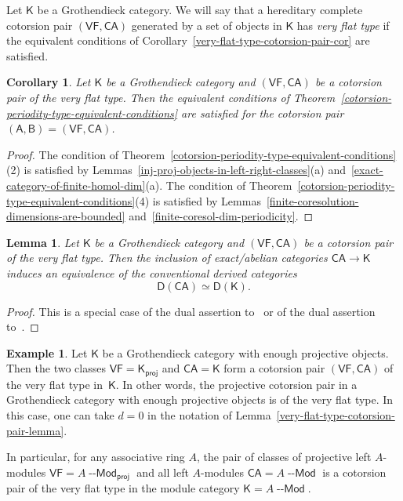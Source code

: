 \documentclass[12pt,a4paper]{amsart}
\newcommand{\+}{\nobreakdash-}
\renewcommand{\:}{\colon}
\newcommand{\rarrow}{\longrightarrow}
\newcommand{\Modl}{{\operatorname{\mathsf{--Mod}}}}
\newcommand{\sA}{\mathsf A}
\newcommand{\sB}{\mathsf B}
\newcommand{\sD}{\mathsf D}
\newcommand{\sK}{\mathsf K}
\newcommand{\VF}{\mathsf{VF}}
\newcommand{\CA}{\mathsf{CA}}
\newcommand{\proj}{\mathsf{proj}}
\theoremstyle{plain}
\newtheorem{lem}[thm]{Lemma}
\newtheorem{cor}[thm]{Corollary}
\theoremstyle{definition}
\newtheorem{ex}[thm]{Example}
\begin{document}
 Let $\sK$ be a Grothendieck category.
 We will say that a hereditary complete cotorsion pair $(\VF,\CA)$
generated by a set of objects in\/ $\sK$ has \emph{very flat type} if
the equivalent conditions of
Corollary~\ref{very-flat-type-cotorsion-pair-cor} are satisfied.

\begin{cor}
 Let\/ $\sK$ be a Grothendieck category and $(\VF,\CA)$ be a cotorsion
pair of the very flat type.
 Then the equivalent conditions of
Theorem~\ref{cotorsion-periodity-type-equivalent-conditions} are
satisfied for the cotorsion pair $(\sA,\sB)=(\VF,\CA)$.
\end{cor}

\begin{proof}
 The condition of
Theorem~\ref{cotorsion-periodity-type-equivalent-conditions}(2) is
satisfied by Lemmas~\ref{inj-proj-objects-in-left-right-classes}(a)
and~\ref{exact-category-of-finite-homol-dim}(a).
 The condition of
Theorem~\ref{cotorsion-periodity-type-equivalent-conditions}(4) is
satisfied by Lemmas~\ref{finite-coresolution-dimensions-are-bounded}
and~\ref{finite-coresol-dim-periodicity}.
\end{proof}

\begin{lem} \label{very-flat-type-conventional-derived-equivalence}
 Let\/ $\sK$ be a Grothendieck category and $(\VF,\CA)$ be a cotorsion
pair of the very flat type.
 Then the inclusion of exact/abelian categories\/ $\CA\rarrow\sK$
induces an equivalence of the conventional derived categories\/
$$
 \sD(\CA)\simeq\sD(\sK).
$$
\end{lem}

\begin{proof}
 This is a special case of the dual assertion
to~\cite[Proposition~5.14]{Sto0} or of the dual assertion
to~\cite[Proposition~A.5.8]{Pcosh}.
\end{proof}

\begin{ex} \label{projective-cotorsion-pair-is-very-flat-type-ex}
 Let $\sK$ be a Grothendieck category with enough projective objects.
 Then the two classes $\VF=\sK_\proj$ and $\CA=\sK$ form a cotorsion
pair $(\VF,\CA)$ of the very flat type in~$\sK$.
 In other words, the projective cotorsion pair in a Grothendieck
category with enough projective objects is of the very flat type.
 In this case, one can take $d=0$ in the notation of
Lemma~\ref{very-flat-type-cotorsion-pair-lemma}.

 In particular, for any associative ring $A$, the pair of classes
of projective left $A$\+modules $\VF=A\Modl_\proj$ and all left
$A$\+modules $\CA=A\Modl$ is a cotorsion pair of the very flat type in
the module category $\sK=A\Modl$.
\end{ex}
\end{document}
